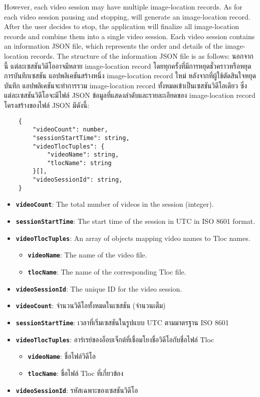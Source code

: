 \ifenglish
However, each video session may have multiple image-location records. As for each video session pausing and stopping, will generate an image-location record. After the user decides to stop, the application will finalize all image-location records and combine them into a single video session. Each video session contains an information JSON file, which represents the order and details of the image-location records. The structure of the information JSON file is as follows:
\else
นอกจากนี้ แต่ละเซสชันวิดีโออาจมีหลาย image-location record โดยทุกครั้งที่มีการหยุดชั่วคราวหรือหยุดการบันทึกเซสชัน แอปพลิเคชันสร้างหนึ่ง image-location record ใหม่ หลังจากที่ผู้ใช้ตัดสินใจหยุดบันทึก แอปพลิเคชันจะทำการรวม image-location record ทั้งหมดเข้าเป็นเซสชันวิดีโอเดียว ซึ่งแต่ละเซสชันวิดีโอจะมีไฟล์ JSON ข้อมูลที่แสดงลำดับและรายละเอียดของ image-location record โครงสร้างของไฟล์ JSON มีดังนี้:
\fi

\begin{lstlisting}
    {
        "videoCount": number,
        "sessionStartTime": string,
        "videoTlocTuples": {
            "videoName": string, 
            "tlocName": string 
        }[],
        "videoSessionId": string,
    }
\end{lstlisting}

\ifenglish
\begin{itemize}
    \item \textbf{\texttt{videoCount}}: The total number of videos in the session (integer).
    \item \textbf{\texttt{sessionStartTime}}: The start time of the session in UTC in ISO 8601 format.
    \item \textbf{\texttt{videoTlocTuples}}: An array of objects mapping video names to Tloc names.
    \begin{itemize}
        \item \textbf{\texttt{videoName}}: The name of the video file.
        \item \textbf{\texttt{tlocName}}: The name of the corresponding Tloc file.
    \end{itemize}
    \item \textbf{\texttt{videoSessionId}}: The unique ID for the video session.
\end{itemize}
\else
\begin{itemize}
    \item \textbf{\texttt{videoCount}}: จำนวนวิดีโอทั้งหมดในเซสชัน (จำนวนเต็ม)
    \item \textbf{\texttt{sessionStartTime}}: เวลาที่เริ่มเซสชันในรูปแบบ UTC ตามมาตรฐาน ISO 8601
    \item \textbf{\texttt{videoTlocTuples}}: อาร์เรย์ของอ็อบเจ็กต์ที่เชื่อมโยงชื่อวิดีโอกับชื่อไฟล์ Tloc
    \begin{itemize}
        \item \textbf{\texttt{videoName}}: ชื่อไฟล์วิดีโอ
        \item \textbf{\texttt{tlocName}}: ชื่อไฟล์ Tloc ที่เกี่ยวข้อง
    \end{itemize}
    \item \textbf{\texttt{videoSessionId}}: รหัสเฉพาะของเซสชันวิดีโอ
\end{itemize}
\fi

